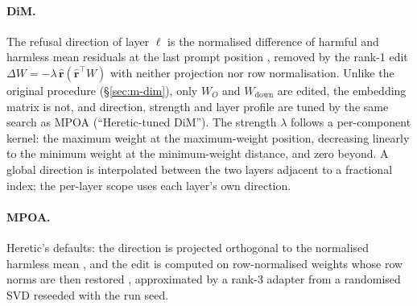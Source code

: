 \paragraph{DiM.} The refusal direction of layer $\ell$ is the normalised
difference of harmful and harmless mean residuals at the last prompt position
\cite{arditi2024refusal}, removed by the rank-1 edit
$\Delta W=-\lambda\,\hat{\mathbf{r}}(\hat{\mathbf{r}}^{\top}W)$ with neither
projection nor row normalisation. Unlike the original procedure
(\S\ref{sec:m-dim}), only $W_O$ and $W_{\mathrm{down}}$ are edited, the
embedding matrix is not, and direction, strength and layer profile are tuned
by the same search as MPOA (``Heretic-tuned DiM''). The strength $\lambda$
follows a per-component kernel: the maximum weight at the maximum-weight
position, decreasing linearly to the minimum weight at the minimum-weight
distance, and zero beyond. A global direction is interpolated between the two
layers adjacent to a fractional index; the per-layer scope uses each layer's
own direction.

\paragraph{MPOA.} Heretic's defaults: the direction is projected orthogonal to
the normalised harmless mean \cite{lai2024projected}, and the edit is computed
on row-normalised weights whose row norms are then restored
\cite{lai2025mpoa}, approximated by a rank-3 adapter from a randomised SVD
reseeded with the run seed.

